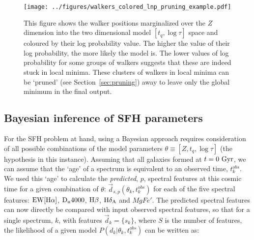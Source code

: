 \documentclass[useAMS,usenatbib]{mn2e}
\begin{document}
\begin{figure}
\centering
\texttt{[image: ../figures/walkers\_colored\_lnp\_pruning\_example.pdf]}
\caption{This figure shows the walker positions marginalized over the $Z$ dimension into the two dimensional model $[t_q, \log\tau]$ space and coloured by their log probability value. The higher the value of their log probability, the more likely the model is. The lower values of log probability for some groups of walkers suggests that these are indeed stuck in local minima. These clusters of walkers in local minima can be `pruned' (see Section~\ref{sec:pruning}) away to leave only the global minimum in the final output.}
\label{fig:localminima}
\end{figure}


\subsection{Bayesian inference of SFH parameters}\label{sec:emcee}

For the SFH problem at hand, using a Bayesian approach requires consideration of all possible combinations of the model parameters $\theta \equiv [Z, t_{q}, \log \tau]$ (the hypothesis in this instance). Assuming that all galaxies formed at $t=0~\rm{Gyr}$, we can assume that the `age' of a spectrum is equivalent to an observed time, $t^{obs}_{k}$. We used this  `age' to calculate the \emph{predicted}, $p$, spectral features at this cosmic time for a given combination of $\theta$: $\vec{d}_{s,p}(\theta_k, t^{obs}_{k})$ for each of the five spectral features: $\rm{EW}[H\alpha]$, $\rm{D}_n4000$, $\rm{H}\beta$, $\rm{H}\delta_A$ and $MgFe'$. The predicted spectral features can now directly be compared with input observed spectral features, so that for a single spectrum, $k$, with features $\vec{d}_{k} = \{s_k\}$, where $S$ is the number of features, the likelihood of a given model $P(d_{k}|\theta_k, t^{obs}_{k})$ can be written as:


\end{document}
